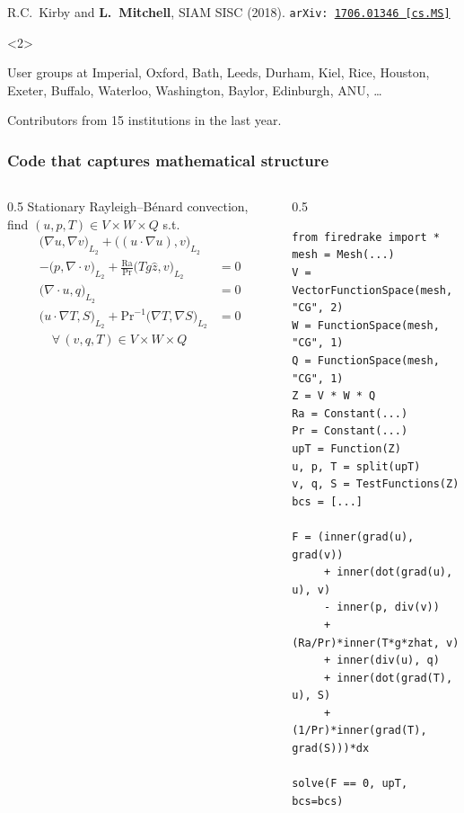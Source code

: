 \documentclass[presentation,aspectratio=43, 10pt]{beamer}
\newcommand{\arxivlink}[2]{{\texttt{arXiv:\,\href{https://arxiv.org/abs/#1}{#1\,[#2]}}}}
\begin{document}
\begin{frame}
\begin{overlayarea}{\textwidth}{0.6\textheight}
\begin{onlyenv}
\begin{flushright}
{      R.C.~Kirby and \textbf{L.~Mitchell}, SIAM SISC (2018). \arxivlink{1706.01346}{cs.MS}\nocite{Kirby:2018}}
    \end{flushright}
  \end{onlyenv}
  \begin{onlyenv}<2>
    \begin{block}{User groups at}
      Imperial, Oxford, Bath, Leeds, Durham, Kiel, Rice, Houston,
      Exeter, Buffalo, Waterloo, Washington, Baylor, Edinburgh, ANU, \dots

      Contributors from 15 institutions in the last year.
    \end{block}
  \end{onlyenv}
\end{overlayarea}
\end{frame}

\begin{frame}[fragile]
  \frametitle{Code that captures mathematical structure}
  \begin{columns}
    \begin{column}{0.5\framewidth}
      Stationary Rayleigh--B\'enard convection, find $(u, p, T) \in V\times W\times Q$ s.t.
        \begin{align*}
          {\big(\nabla u, \nabla v\big)}_{L_2} + {\big((u \cdot \nabla u), v\big)}_{L_2} \\
          - {\big(p, \nabla\cdot v\big)}_{L_2} + \frac{\text{Ra}}{\text{Pr}}
          {\big(Tg\hat{z}, v\big)}_{L_2} &= 0 \\
          {\big(\nabla\cdot u, q\big)}_{L_2} &= 0\\
          {\big(u \cdot \nabla T, S\big)}_{L_2}
          + \text{Pr}^{-1} {\big(\nabla T, \nabla S\big)}_{L_2} &= 0\\
          \quad \forall\, (v,q,T) \in V\times W \times Q
        \end{align*}
    \end{column}
      \begin{column}{0.5\framewidth}
\begin{verbatim}
from firedrake import *
mesh = Mesh(...)
V = VectorFunctionSpace(mesh, "CG", 2)
W = FunctionSpace(mesh, "CG", 1)
Q = FunctionSpace(mesh, "CG", 1)
Z = V * W * Q
Ra = Constant(...)
Pr = Constant(...)
upT = Function(Z)
u, p, T = split(upT)
v, q, S = TestFunctions(Z)
bcs = [...]

F = (inner(grad(u), grad(v))
     + inner(dot(grad(u), u), v)
     - inner(p, div(v))
     + (Ra/Pr)*inner(T*g*zhat, v)
     + inner(div(u), q)
     + inner(dot(grad(T), u), S)
     + (1/Pr)*inner(grad(T), grad(S)))*dx

solve(F == 0, upT, bcs=bcs)
\end{verbatim}
      \end{column}
  \end{columns}
\end{frame}
\end{document}
